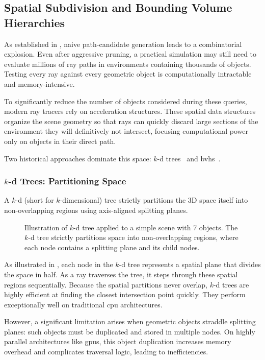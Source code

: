 \subsection{Spatial Subdivision and Bounding Volume Hierarchies}

As established in , naive path-candidate generation leads to a combinatorial explosion. Even after aggressive pruning, a practical simulation may still need to evaluate millions of ray paths in environments containing thousands of objects. Testing every ray against every geometric object is computationally intractable and memory-intensive.

To significantly reduce the number of objects considered during these queries, modern ray tracers rely on acceleration structures. These spatial data structures organize the scene geometry so that rays can quickly discard large sections of the environment they will definitively not intersect, focusing computational power only on objects in their direct path.

Two historical approaches dominate this space: $k$-d trees~ and \glspl{bvh}~.

\subsubsection{$k$-d Trees: Partitioning Space}

A $k$-d (short for $k$-dimensional) tree strictly partitions the 3D space itself into non-overlapping regions using axis-aligned splitting planes.

\begin{figure}
  \caption{Illustration of $k$-d tree applied to a simple scene with 7 objects. The $k$-d tree strictly partitions space into non-overlapping regions, where each node contains a splitting plane and its child nodes.}
\end{figure}

As illustrated in , each node in the $k$-d tree represents a spatial plane that divides the space in half. As a ray traverses the tree, it steps through these spatial regions sequentially. Because the spatial partitions never overlap, $k$-d trees are highly efficient at finding the closest intersection point quickly. They perform exceptionally well on traditional \gls{cpu} architectures.

However, a significant limitation arises when geometric objects straddle splitting planes: such objects must be duplicated and stored in multiple nodes. On highly parallel architectures like \glspl{gpu}, this object duplication increases memory overhead and complicates traversal logic, leading to inefficiencies.

